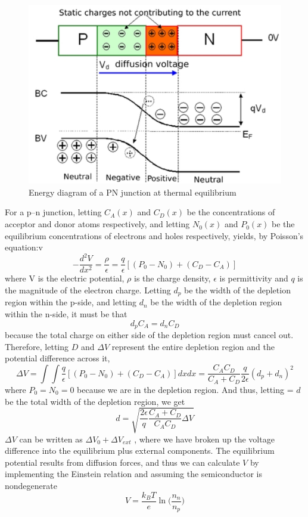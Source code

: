 \begin{figure}[H]
  \centering
  \includegraphics[width=0.35\linewidth]{Graphics/Chapter3/PNjunction.PNG}
  \caption{Energy diagram of a PN junction at thermal equilibrium\cite{PN}}
  \label{fig:PNjunction}
\end{figure}

For a p–n junction, letting  $C_A(x)$ and $C_D(x)$ be the concentrations of acceptor and donor atoms respectively, and letting  $N_0(x)$ and $P_0(x)$ be the equilibrium concentrations of electrons and holes respectively, yields, by Poisson's equation:v
$$
-\frac{d^2V}{dx^2} = \frac{\rho}{\epsilon} = \frac{q}{\epsilon}[(P_0 - N_0) + (C_D - C_A)]
$$
where V is the electric potential, $\rho$ is the charge density, $\epsilon$ is permittivity and $q$ is the magnitude of the electron charge. Letting $d_p$  be the width of the depletion region within the p-side, and letting $d_n$ be the width of the depletion region within the n-side, it must be that
$$
d_pC_A = d_nC_D
$$
because the total charge on either side of the depletion region must cancel out. Therefore, letting $D$ and $\Delta V$ represent the entire depletion region and the potential difference across it,
$$
\Delta V = \int \int \frac{q}{\epsilon}[(P_0 - N_0) + (C_D - C_A)] dxdx = \frac{C_AC_D}{C_A + C_D} \frac{q}{2\epsilon} (d_p + d_n)^2
$$
where $P_0 = N_0 = 0$ because we are in the depletion region. And thus, letting = $d$ be the total width of the depletion region, we get
$$
d = \sqrt{\frac{2 \epsilon}{q} \frac{C_A + C_D}{C_AC_D} \Delta V}
$$
$\Delta V$ can be written as $\Delta V_0 + \Delta V_{ext}$ , where we have broken up the voltage difference into the equilibrium plus external components. The equilibrium potential results from diffusion forces, and thus we can calculate $V$  by implementing the Einstein relation and assuming the semiconductor is nondegenerate
$$
V = \frac{k_B T}{e} \ln\bigg(\frac{n_n}{n_p}\bigg)
$$